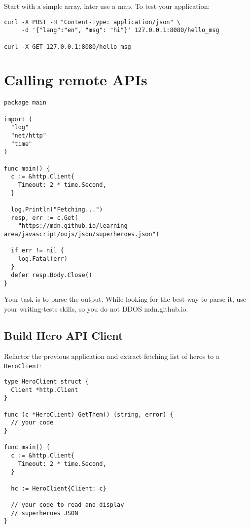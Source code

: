 \documentclass[11pt, letterpaper]{article}
\begin{document}
Start with a simple array, later use a map. To test your application:

\begin{verbatim}
curl -X POST -H "Content-Type: application/json" \
     -d '{"lang":"en", "msg": "hi"}' 127.0.0.1:8080/hello_msg

curl -X GET 127.0.0.1:8080/hello_msg
\end{verbatim}

\pagebreak
\section{Calling remote APIs}

\begin{verbatim}
package main

import (
  "log"
  "net/http"
  "time"
)

func main() {
  c := &http.Client{
    Timeout: 2 * time.Second,
  }

  log.Println("Fetching...")
  resp, err := c.Get(
    "https://mdn.github.io/learning-area/javascript/oojs/json/superheroes.json")

  if err != nil {
    log.Fatal(err)
  }
  defer resp.Body.Close()
}
\end{verbatim}

Your task is to parse the output. While looking for the best way to parse it, use your writing-tests skills, so you do not {\small DDOS} mdn.github.io.

\subsection{Build Hero API Client}

Refactor the previous application and extract fetching list of heros to a \verb|HeroClient|:

\begin{verbatim}
type HeroClient struct {
  Client *http.Client
}

func (c *HeroClient) GetThem() (string, error) {
  // your code
}

func main() {
  c := &http.Client{
    Timeout: 2 * time.Second,
  }

  hc := HeroClient{Client: c}
  
  // your code to read and display 
  // superheroes JSON
}
\end{verbatim}

\end{document}
